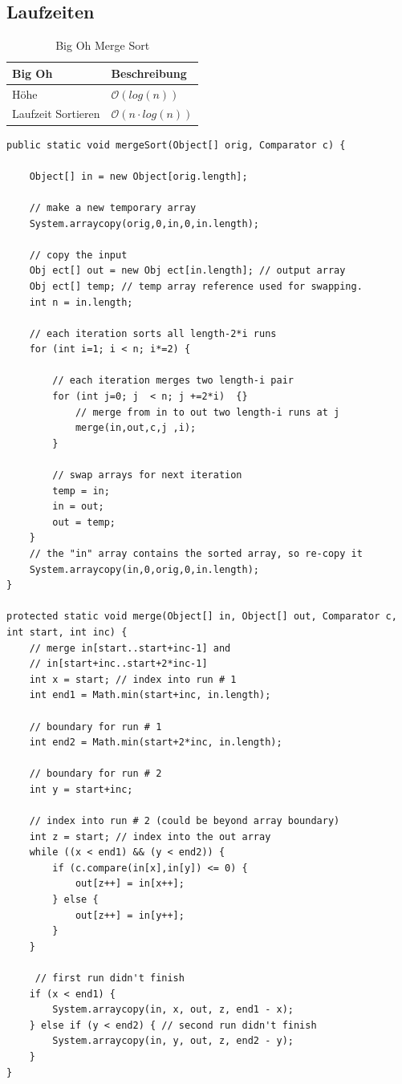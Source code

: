 \subsection{Laufzeiten}
\begin{table}[h]
	\centering
	\begin{tabu} to \linewidth {l l}
		\toprule
		Big Oh & Beschreibung \\
		\midrule
		Höhe & $\mathcal{O}(log (n))$ \\
		Laufzeit Sortieren & $\mathcal{O}(n \cdot log(n))$ \\
		\bottomrule
	\end{tabu}
	\caption{Big Oh Merge Sort}
\end{table}

\clearpage

\begin{lstlisting}[caption=Nicht Rekursiver Merge Sort]
public static void mergeSort(Object[] orig, Comparator c) {

	Object[] in = new Object[orig.length];

	// make a new temporary array
	System.arraycopy(orig,0,in,0,in.length);

	// copy the input
	Obj ect[] out = new Obj ect[in.length]; // output array
	Obj ect[] temp; // temp array reference used for swapping.
	int n = in.length;

	// each iteration sorts all length-2*i runs
	for (int i=1; i < n; i*=2) {

		// each iteration merges two length-i pair
		for (int j=0; j  < n; j +=2*i)  {}
			// merge from in to out two length-i runs at j
			merge(in,out,c,j ,i);
		}

		// swap arrays for next iteration
		temp = in;
		in = out;
		out = temp;
	}
	// the "in" array contains the sorted array, so re-copy it
	System.arraycopy(in,0,orig,0,in.length);
}

protected static void merge(Object[] in, Object[] out, Comparator c, int start, int inc) {
	// merge in[start..start+inc-1] and
	// in[start+inc..start+2*inc-1]
	int x = start; // index into run # 1
	int end1 = Math.min(start+inc, in.length);

	// boundary for run # 1
	int end2 = Math.min(start+2*inc, in.length);

	// boundary for run # 2
	int y = start+inc;

	// index into run # 2 (could be beyond array boundary)
	int z = start; // index into the out array
	while ((x < end1) && (y < end2)) {
		if (c.compare(in[x],in[y]) <= 0) {
			out[z++] = in[x++];
		} else {
			out[z++] = in[y++];
		}
	}

	 // first run didn't finish
	if (x < end1) {
		System.arraycopy(in, x, out, z, end1 - x);
	} else if (y < end2) { // second run didn't finish
		System.arraycopy(in, y, out, z, end2 - y);
	}
}
\end{lstlisting}


